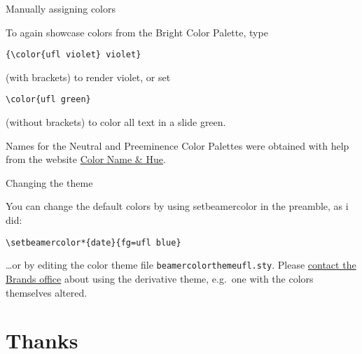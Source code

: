 \documentclass{beamer}
\begin{document}
\begin{frame}[fragile]{Manually assigning colors}

To again showcase colors from the Bright Color Palette, type
\begin{verbatim}
{\color{ufl violet} violet}
\end{verbatim}
(with brackets) to render {\color{ufl violet} violet}, or set
\begin{verbatim}
\color{ufl green}
\end{verbatim}
\color{ufl green}
(without brackets) to color all text in a slide green.

\color{black}\vfill
Names for the Neutral and Preeminence Color Palettes were obtained with help from the website \href{https://www.color-blindness.com/color-name-hue/}{Color Name \& Hue}.

\center\href{http://identity.ufl.edu/color/}{}

\end{frame}


\begin{frame}[fragile]{Changing the theme}

You can change the default colors by using setbeamercolor in the preamble, as i did:
\begin{verbatim}
\setbeamercolor*{date}{fg=ufl blue}
\end{verbatim}
\ldots or by editing the color theme file {\tt beamercolorthemeufl.sty}.
Please \hyperlink{http://identity.ufl.edu/support/contact/}{contact the Brands office} about using the derivative theme, e.g.\ one with the colors themselves altered.

\end{frame}


\section{Thanks}
\end{document}
